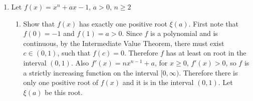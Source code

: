 \documentclass[11pt]{article}
\begin{document}
\begin{enumerate}
\begin{enumerate}
            \item[(c)]
                \begin{align*}
                    (cond\, f)(x) &= \abs{\frac{xf'(x)}{f(x)}} \\
                    &= \abs{\frac{\frac{x\sin{x} - (1 - \cos{x})}{x}}{\frac{(1 - \cos{x})}{x}}} \\
                    &= \abs{\frac{x\sin{x} - (1 - \cos{x})}{(1 - \cos{x})}}
                    \intertext{As $x \to 0$, both the numerator and the denominator go to 0 so L'Hopital's rule must be used}
                    \lim{x \to 0}{(cond\, f)(x)} &= \abs{\frac{\sin{x} + x\cos{x} - \sin{x}}{\sin{x}}} \Big|_{x = 0}
                    &= \abs{\frac{1 + 0 - 1}{1}} = 0 
                \end{align*}
        \end{enumerate}

    \item %
        Let $f(x) = x^n + ax - 1$, $a > 0$, $n \ge 2$
        \begin{enumerate}
            \item[(a)]
                Show that $f(x)$ has exactly one positive root $\xi(a)$.
                First note that $f(0) = -1$ and $f(1) = a > 0$.
                Since $f$ is a polynomial and is continuous, by the
                Intermediate Value Theorem, there must exist $c \in (0, 1)$,
                such that $f(c) = 0$.
                Therefore $f$ has at least on root in the interval $(0, 1)$.
                Also $f'(x) = nx^{n-1} + a$, for $x \ge 0$, $f'(x) > 0$, so
                $f$ is a strictly increasing function on the interval
                $[0, \infty)$.
                Therefore there is only one positive root of $f(x)$ and it is
                in the interval $(0, 1)$.
                Let $\xi(a)$ be this root.


\end{enumerate}
\end{enumerate}
\end{document}
